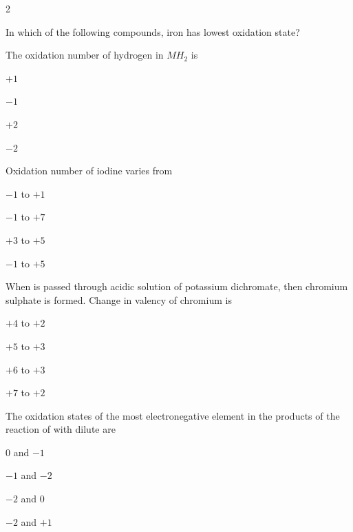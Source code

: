 \documentclass[10pt,a4paper]{article}
\begin{document}
\begin{multicols}{2}
\begin{questions}[start=1]
\item In which of the following compounds, iron has lowest oxidation state?
\begin{options}
  \item {}
  \item {}
  \item {}
  \item {}
\end{options}

\item The oxidation number of hydrogen in $MH_2$ is
\begin{options}
  \item $+1$
  \item $-1$
  \item $+2$
  \item $-2$
\end{options}

\item Oxidation number of iodine varies from
\begin{options}
  \item $-1$ to $+1$
  \item $-1$ to $+7$
  \item $+3$ to $+5$
  \item $-1$ to $+5$
\end{options}

\item When  is passed through acidic solution of potassium dichromate, then chromium sulphate is formed. Change in valency of chromium is
\begin{options}
  \item $+4$ to $+2$
  \item $+5$ to $+3$
  \item $+6$ to $+3$
  \item $+7$ to $+2$
\end{options}

\item The oxidation states of the most electronegative element in the products of the reaction of  with dilute  are
\begin{options}
  \item 0 and $-1$
  \item $-1$ and $-2$
  \item $-2$ and 0
  \item $-2$ and $+1$
\end{options}


\end{questions}
\end{multicols}
\end{document}
